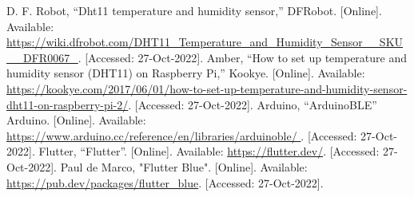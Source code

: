 \begin{thebibliography}{00}
     D. F.  Robot, “Dht11 temperature and humidity sensor,” DFRobot. [Online]. Available: \url{https://wiki.dfrobot.com/DHT11_Temperature_and_Humidity_Sensor__SKU__DFR0067_}. [Accessed: 27-Oct-2022]. 
     Amber, “How to set up temperature and humidity sensor (DHT11) on Raspberry Pi,” Kookye. [Online]. Available: \url{https://kookye.com/2017/06/01/how-to-set-up-temperature-and-humidity-sensor-dht11-on-raspberry-pi-2/}. [Accessed: 27-Oct-2022]. 
     Arduino, “ArduinoBLE” Arduino. [Online]. Available: \url{https://www.arduino.cc/reference/en/libraries/arduinoble/ }. [Accessed: 27-Oct-2022]. 
     Flutter, “Flutter”. [Online]. Available: \url{https://flutter.dev/}. [Accessed: 27-Oct-2022].
     Paul de Marco, "Flutter Blue". [Online]. Available: \url{https://pub.dev/packages/flutter_blue}. [Accessed: 27-Oct-2022].
\end{thebibliography}
